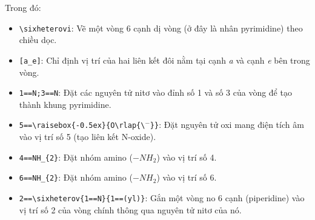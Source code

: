 \documentclass[../main.tex]{subfiles}
\begin{document}
Trong đó:
\begin{itemize}
  \item \texttt{\textbackslash sixheterovi}: Vẽ một vòng 6 cạnh dị vòng (ở đây là nhân pyrimidine) theo chiều dọc.
  \item \texttt{[a\_e]}: Chỉ định vị trí của hai liên kết đôi nằm tại cạnh \textit{a} và cạnh \textit{e} bên trong vòng.
  \item \texttt{1==N;3==N}: Đặt các nguyên tử nitơ vào đỉnh số 1 và số 3 của vòng để tạo thành khung pyrimidine.
  \item \texttt{5==\textbackslash raisebox\{-0.5ex\}\{O\textbackslash rlap\{\textbackslash $^{-}$\}\}}: Đặt nguyên tử oxi mang điện tích âm vào vị trí số 5 (tạo liên kết N-oxide).
  \item \texttt{4==NH\_\{2\}}: Đặt nhóm amino ($-NH_2$) vào vị trí số 4.
  \item \texttt{6==NH\_\{2\}}: Đặt nhóm amino ($-NH_2$) vào vị trí số 6.
  \item \texttt{2==\textbackslash sixheterov\{1==N\}\{1==(yl)\}}: Gắn một vòng no 6 cạnh (piperidine) vào vị trí số 2 của vòng chính thông qua nguyên tử nitơ của nó.
\end{itemize}
\end{document}
